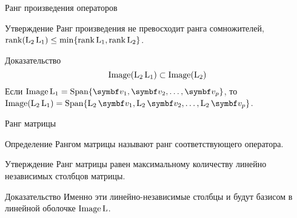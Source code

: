 \begin{frame}{Ранг произведения операторов}

\begin{block}{Утверждение}
Ранг произведения не превосходит ранга сомножителей, $\rank (\operatorname{L}_2 \operatorname{L}_1) \leq \min \{\rank \operatorname{L}_1, \rank \operatorname{L}_2 \}$.
\end{block}

\pause
\begin{block}{Доказательство}
\[
\operatorname{Image}(\operatorname{L}_2\operatorname{L}_1) \subset \operatorname{Image}(\operatorname{L}_2)  
\]
\pause
Если $\Image \LL_1 = \Span\{ \bv_1, \bv_2, \ldots, \bv_p \}$, то $\Image (\LL_2 \LL_1 ) =\Span\{ \LL_2 \bv_1, \LL_2 \bv_2, \ldots, \LL_2 \bv_p \}$.

\end{block}
\end{frame}
  






\begin{frame}{Ранг матрицы}

\begin{block}{Определение}
\alert{Рангом матрицы} называют ранг соответствующего оператора.
\end{block}

\pause

\begin{block}{Утверждение}
Ранг матрицы равен максимальному количеству линейно независимых столбцов матрицы. 
\end{block}

\pause
\begin{block}{Доказательство}
Именно эти линейно-независимые столбцы и будут базисом в линейной оболочке $\operatorname{Image} \operatorname{L}$. 
\end{block}


\end{frame}




